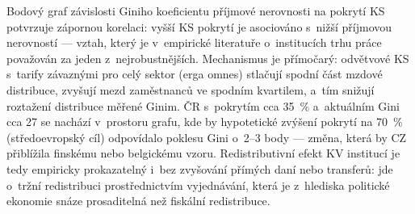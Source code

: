 Bodový graf závislosti Giniho koeficientu příjmové nerovnosti na pokrytí \ac{KS} potvrzuje zápornou korelaci: vyšší \ac{KS} pokrytí je asociováno s~nižší příjmovou nerovností --- vztah, který je v~empirické literatuře o~institucích trhu práce považován za jeden z~nejrobustnějších.
Mechanismus je přímočarý: odvětvové \ac{KS} s~tarify závaznými pro celý sektor (erga omnes) stlačují spodní část mzdové distribuce, zvyšují mezd zaměstnanců ve spodním kvartilem, a~tím snižují roztažení distribuce měřené Ginim.
ČR s~pokrytím cca \SI{35}{\percent} a~aktuálním Gini cca 27 se nachází v~prostoru grafu, kde by hypotetické zvýšení pokrytí na \SI{70}{\percent} (středoevropský cíl) odpovídalo poklesu Gini o~2--3 body --- změna, která by CZ přiblížila finskému nebo belgickému vzoru.
Redistributivní efekt \ac{KV} institucí je tedy empiricky prokazatelný i~bez zvyšování přímých daní nebo transferů: jde o~tržní redistribuci prostřednictvím vyjednávání, která je z~hlediska politické ekonomie snáze prosaditelná než fiskální redistribuce.


